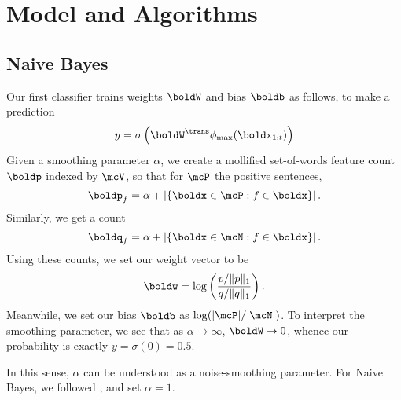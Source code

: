 \documentclass[11pt]{article}
\begin{document}




\section{Model and Algorithms}

\subsection{Naive Bayes}
Our first classifier trains weights $\boldW$ and bias $\boldb$ as follows, to make a prediction
\[y = \sigma\left(\boldW^{\trans}\phi_{\textnormal{max}}(\boldx_{1:t})\right)\]
Given a smoothing parameter $\alpha$, we create a mollified set-of-words feature count $\boldp$ indexed by $\mcV$, so that for $\mcP$ the positive sentences,
\[\boldp_{f} = \alpha + \left\lvert\{\boldx \in \mcP: f \in \boldx\}\right\rvert.\]
Similarly, we get a count
\[\boldq_{f} = \alpha + \left\lvert\{\boldx \in \mcN: f \in \boldx\}\right\rvert.\]
Using these counts, we set our weight vector to be
\[\boldw = \log\left(\frac{p/\lVert p\rVert_1}{q/\lVert q \rVert_1}\right).\]
Meanwhile, we set our bias $\boldb$ as $\log(\lvert \mcP \rvert / \lvert \mcN \rvert)$.
To interpret the smoothing parameter, we see that as $\alpha\to \infty$, $\boldW \to 0$, whence our probability is exactly $y=\sigma(0)=0.5$.

In this sense, $\alpha$ can be understood as a noise-smoothing parameter. For Naive Bayes, we followed \cite{wang2012baselines}, and set $\alpha=1$.
\end{document}
